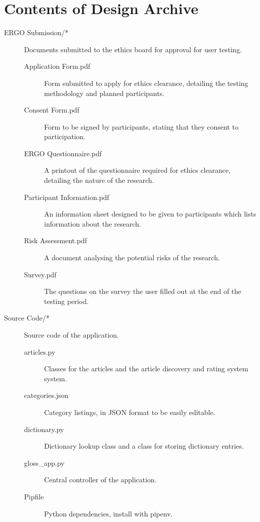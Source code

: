 \chapter{Contents of Design Archive}
\begin{description}
	\item[ERGO Submission/*] Documents submitted to the ethics board for approval for user testing.
	\begin{description}
		\item[Application Form.pdf] Form submitted to apply for ethics clearance, detailing the testing methodology and planned participants.
		
		\item[Consent Form.pdf] Form to be signed by participants, stating that they consent to participation.
		
		\item[ERGO Questionnaire.pdf] A printout of the questionnaire required for ethics clearance, detailing the nature of the research.
		
		\item[Participant Information.pdf] An information sheet designed to be given to participants which lists information about the research.
		
		\item[Risk Assessment.pdf] A document analysing the potential risks of the research.
		
		\item[Survey.pdf] The questions on the survey the user filled out at the end of the testing period. 
	\end{description}
	
	\item[Source Code/*] Source code of the application.
	\begin{description}
	\item[articles.py] Classes for the articles and the article discovery and rating system system.
	
	\item[categories.json] Category listings, in JSON format to be easily editable.
	
	\item[dictionary.py] Dictionary lookup class and a class for storing dictionary entries.
	
	\item[gloss\_app.py] Central controller of the application.
	
	\item[Pipfile] Python dependencies, install with pipenv.
	

\end{description}
\end{description}
